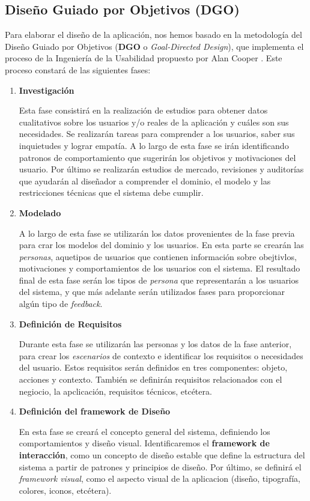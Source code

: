   \subsection{Diseño Guiado por Objetivos (DGO)}\label{ssec:dgoDesign}
  
  Para elaborar el diseño de la aplicación, nos hemos basado en la metodología del Diseño Guiado por Objetivos (\textbf{DGO} o \textit{Goal-Directed Design}), que implementa el proceso de la Ingeniería de la Usabilidad propuesto por Alan Cooper \cite{ref:bookAlanCooper}. Este proceso constará de las siguientes fases:

\begin{enumerate}

\item \textbf{Investigación}

Esta fase consistirá en la realización de estudios para obtener datos cualitativos sobre los usuarios y/o reales de la aplicación y cuáles son sus necesidades. Se realizarán tareas para comprender a los usuarios, saber sus inquietudes y lograr empatía. A lo largo de esta fase se irán identificando patronos de comportamiento que sugerirán los objetivos y motivaciones del usuario. Por último se realizarán estudios de mercado, revisiones y auditorías que ayudarán al diseñador a comprender el dominio, el modelo y las restricciones técnicas que el sistema debe cumplir.

\item \textbf{Modelado}

A lo largo de esta fase se utilizarán los datos provenientes de la fase previa para crar los modelos del dominio y los usuarios. En esta parte se crearán las \textit{personas}, aquetipos de usuarios que contienen información sobre obejtivlos, motivaciones y comportamientos de los usuarios con el sistema. El resultado final de esta fase serán los tipos de \textit{persona} que representarán a los usuarios del sistema, y que más adelante serán utilizados fases para proporcionar algún tipo de \textit{feedback}.

\item \textbf{Definición de Requisitos}

Durante esta fase se utilizarán las personas y los datos de la fase anterior, para crear los \textit{escenarios} de contexto e identificar los requisitos o necesidades del usuario. Estos requisitos serán definidos en tres componentes: objeto, acciones y contexto. También se definirán requisitos relacionados con el negiocio, la apclicación, requisitos técnicos, etcétera.

\item \textbf{Definición del framework de Diseño}

En esta fase se creará el concepto general del sistema, definiendo los comportamientos y diseño visual. Identificaremos el \textbf{framework de interacción}, como un concepto de diseño estable que define la estructura del sistema a partir de patrones y principios de diseño. Por último, se definirá el \textit{framework visual}, como el aspecto visual de la aplicacion (diseño, tipografía, colores, iconos, etcétera).

\end{enumerate}

